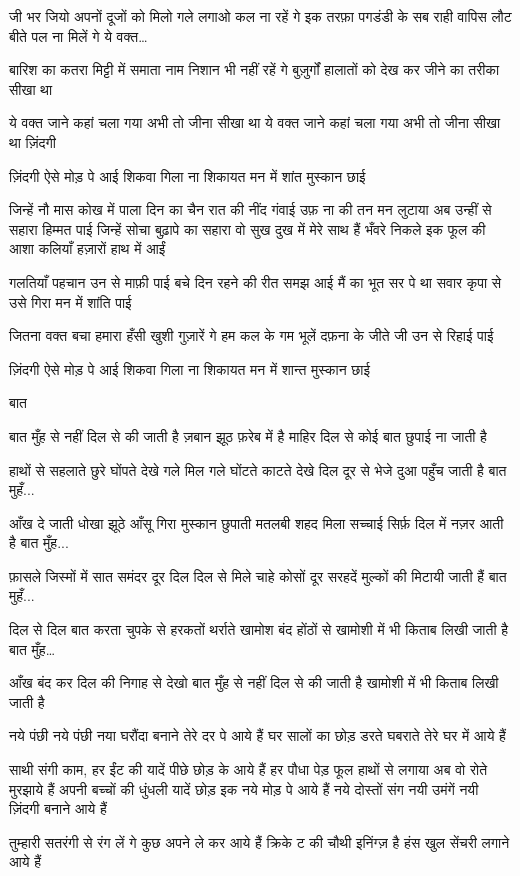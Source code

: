 जी भर जियो अपनों दूजों को मिलो
गले लगाओ कल ना रहें गे
इक तरफ़ा पगडंडी के सब राही
वापिस लौट बीते पल ना मिलें गे
ये वक्त…

बारिश का कतरा मिट्टी में समाता
नाम निशान भी नहीं रहें गे
बुज़ुर्गों हालातों को देख कर
जीने का तरीका सीखा था

ये वक्त जाने कहां चला गया
अभी तो जीना सीखा था
ये वक्त जाने कहां चला गया
अभी तो जीना सीखा था
ज़िंदगी

ज़िंदगी ऐसे मोड़ पे आई
शिकवा गिला ना शिकायत
मन में शांत मुस्कान छाई

जिन्हें नौ मास कोख में पाला
दिन का चैन रात की नींद गंवाई
उफ़ ना की तन मन लुटाया
अब उन्हीं से सहारा हिम्मत पाई
जिन्हें सोचा बुढ़ापे का सहारा
वो सुख दुख में मेरे साथ हैं
भँवरे निकले इक फूल की आशा
कलियाँ हज़ारों हाथ में आईं

गलतियाँ पहचान उन से माफ़ी पाई
बचे दिन रहने की रीत समझ आई
मैं का भूत सर पे था सवार
कृपा से उसे गिरा मन में शांति पाई

जितना वक्त बचा हमारा
हँसी खुशी गुज़ारें गे हम
कल के गम भूलें दफ़ना के
जीते जी उन से रिहाई पाई

ज़िंदगी ऐसे मोड़ पे आई
शिकवा गिला ना शिकायत
मन में शान्त मुस्कान छाई

बात

बात मुँह से नहीं दिल से की जाती है
ज़बान झूठ फ़रेब में है माहिर
दिल से कोई बात छुपाई ना जाती है

हाथों से सहलाते छुरे घोंपते देखे
गले मिल गले घोंटते काटते देखे
दिल दूर से भेजे दुआ पहुँच जाती है
बात मुहँ...

आँख दे जाती धोखा झूठे आँसू गिरा
मुस्कान छुपाती मतलबी शहद मिला
सच्चाई सिर्फ़ दिल में नज़र आती है
बात मुँह...

फ़ासले जिस्मों में सात समंदर दूर
दिल दिल से मिले चाहे कोसों दूर
सरहदें मुल्कों की मिटायी जाती हैं 
बात मुहँ...




दिल से दिल बात करता चुपके से
हरकतों थर्राते खामोश बंद होंठों से
खामोशी में भी किताब लिखी जाती है
बात मुँह…

आँख बंद कर दिल की निगाह से देखो
बात मुँह से नहीं दिल से की जाती है
खामोशी में भी किताब लिखी जाती है

नये पंछी
नये पंछी नया घरौंदा बनाने
तेरे दर पे आये हैं
घर सालों का छोड़
डरते घबराते तेरे घर में आये हैं

साथी संगी काम, हर ईंट की यादें
पीछे छोड़ के आये हैं
हर पौधा पेड़ फूल हाथों से लगाया
अब वो रोते मुरझाये हैं
अपनी बच्चों की धुंधली यादें छोड़
इक नये मोड़ पे आये हैं
नये दोस्तों संग नयी उमंगें
नयी ज़िंदगी बनाने आये हैं

तुम्हारी सतरंगी से रंग लें गे
कुछ अपने ले कर आये हैं
क्रिके ट की चौथी इनिंग्ज़ है
हंस खुल सेंचरी लगाने आये हैं

